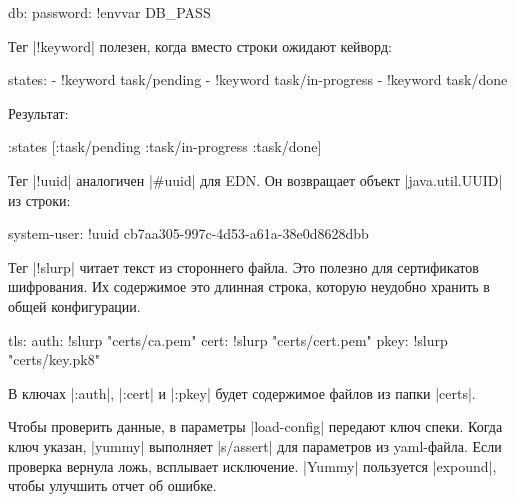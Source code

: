 \begin{english}
  \begin{yaml}
db:
  password: !envvar DB_PASS
  \end{yaml}
\end{english}

Тег \spverb|!keyword| полезен, когда вместо строки ожидают кейворд:

\begin{english}
  \begin{yaml}
states:
  - !keyword task/pending
  - !keyword task/in-progress
  - !keyword task/done
  \end{yaml}
\end{english}

Результат:

\begin{english}
  \begin{clojure}
{:states [:task/pending :task/in-progress :task/done]}
  \end{clojure}
\end{english}

Тег \spverb|!uuid| аналогичен \spverb|#uuid| для EDN. Он возвращает объект
\spverb|java.util.UUID| из строки:

\begin{english}
  \begin{yaml}
system-user: !uuid cb7aa305-997c-4d53-a61a-38e0d8628dbb
  \end{yaml}
\end{english}

Тег \spverb|!slurp| читает текст из стороннего файла. Это полезно для
сертификатов шифрования. Их содержимое это длинная строка, которую неудобно
хранить в общей конфигурации.

\begin{english}
  \begin{yaml}
tls:
  auth: !slurp "certs/ca.pem"
  cert: !slurp "certs/cert.pem"
  pkey: !slurp "certs/key.pk8"
  \end{yaml}
\end{english}

В ключах \spverb|:auth|, \spverb|:cert| и \spverb|:pkey| будет содержимое файлов
из папки \spverb|certs|.

Чтобы проверить данные, в параметры \spverb|load-config| передают ключ
спеки. Когда ключ указан, \spverb|yummy| выполняет \spverb|s/assert| для
параметров из yaml-файла. Если проверка вернула ложь, всплывает
исключение. \spverb|Yummy| пользуется \spverb|expound|, чтобы улучшить отчет об
ошибке.

